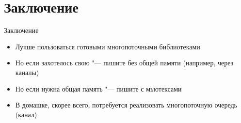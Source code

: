 \section{Заключение}

\begin{frame}{Заключение}
	\begin{itemize}
		\item Лучше пользоваться готовыми многопоточными библиотеками
		\item Но если захотелось свою "--- пишите без общей памяти (например, через каналы)
		\item Но если нужна общая память "--- пишите с мьютексами
		\item В домашке, скорее всего, потребуется реализовать многопоточную очередь (канал)
	\end{itemize}
\end{frame}
